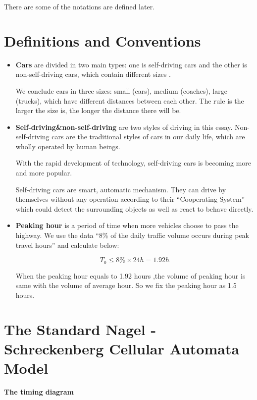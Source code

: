 \documentclass{mcmthesis}
\numberwithin{equation}{section}
\begin{document}
		There are some of the notations are defined later.

	\section{Definitions and Conventions}

		\begin{itemize}
			\item \textbf{Cars} are divided in two main types: one is self-driving cars and the other is non-self-driving cars, which contain different sizes .

			We conclude cars in three sizes: small (cars), medium (coaches), large (trucks), which have different distances between each other. The rule is the larger the size is, the longer the distance there will be.

			\item \textbf{Self-driving\&non-self-driving} are two styles of driving in this essay. Non-self-driving cars are the traditional styles of cars in our daily life, which are wholly operated by human beings.

			With the rapid development of technology, self-driving cars is becoming more and more popular.

			Self-driving cars are smart, automatic mechanism. They can drive by themselves without any operation according to their “Cooperating System” which could detect the surrounding objects as well as react to behave directly.

			\item \textbf{Peaking hour} is a period of time when more vehicles choose to pass the highway. We use the data “8\% of the daily traffic volume occurs during peak travel hours” and calculate below:

			\begin{equation}
				T_{0} \leq 8\%\times24h = 1.92h
			\end{equation}

			When the peaking hour equals to 1.92 hours ,the volume of peaking hour is same with the volume of average hour. So we fix the peaking hour as 1.5 hours.
		\end{itemize}

	\section{The Standard Nagel - Schreckenberg Cellular Automata Model}
		\noindent \textbf{The timing diagram}
\end{document}
